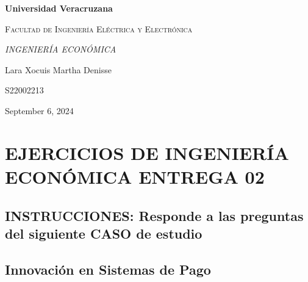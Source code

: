 \documentclass[letterpaper,12pt]{article}
\begin{document}
\thispagestyle{empty}
\newpage
\setcounter{page}{1}
\pagestyle{headings}
\begin{sloppypar} 
    \begin{titlepage}
        \hspace{2.5cm}
        {\bfseries\LARGE Universidad Veracruzana \par}
        \hspace{2cm}
        {\scshape\Large Facultad de Ingeniería Eléctrica y Electrónica \par}
        \begin{center}
            \vspace{7cm}
            {\itshape\huge INGENIERÍA ECONÓMICA \par}
            {\large Lara Xocuis Martha Denisse\par}
            {\large S22002213 \par}
            \vfill
            {\Large September 6, 2024 \par}
        \end{center}
    \end{titlepage} 

\section*{EJERCICIOS DE INGENIERÍA ECONÓMICA ENTREGA 02}
\subsection*{INSTRUCCIONES: Responde a las preguntas del siguiente CASO de estudio}
\subsection{Innovación en Sistemas de Pago}


\end{sloppypar}
\end{document}
